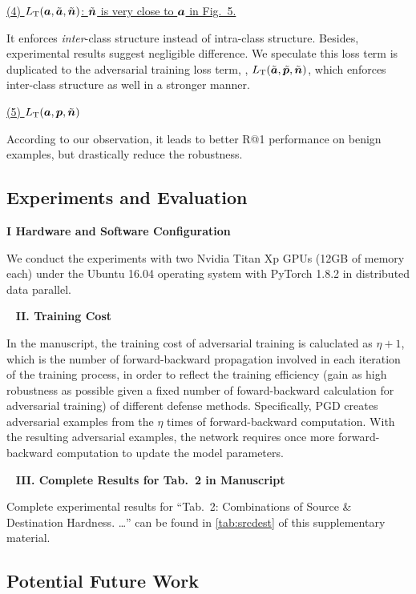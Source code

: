 \ul{(4) $L_\text{T}({\bm{a}}, \tilde{{\bm{a}}}, \tilde{{\bm{n}}})$: $\tilde{{\bm{n}}}$ is very close to ${\bm{a}}$ in Fig.~5.}

It enforces \emph{inter}-class structure instead of intra-class structure.
%
Besides, experimental results suggest negligible difference.
%
We speculate this loss term is duplicated to the adversarial training loss term,
\ie, $L_\text{T}(\tilde{{\bm{a}}}, \tilde{{\bm{p}}}, \tilde{{\bm{n}}})$, which enforces
inter-class structure as well in a stronger manner.

\ul{(5) $L_\text{T}({\bm{a}}, {\bm{p}}, \tilde{{\bm{n}}})$}

According to our observation, it leads to better R@1 performance on benign
examples, but drastically reduce the robustness.

\subsection{Experiments and Evaluation}

\noindent\textbf{I Hardware and Software Configuration}

We conduct the experiments with two Nvidia Titan Xp GPUs (12GB of memory each)
under the Ubuntu 16.04 operating system with PyTorch 1.8.2 in distributed data
parallel.

~\newline
\noindent\textbf{II. Training Cost}

In the manuscript, the training cost of adversarial training is caluclated as
$\eta+1$, which is the number of forward-backward propagation involved in each
iteration of the training process, in order to reflect the training efficiency
(gain as high robustness as possible given a fixed number of foward-backward
calculation for adversarial training) of different defense methods.
%
Specifically, PGD creates adversarial examples from the $\eta$ times of
forward-backward computation.
%
With the resulting adversarial examples, the network requires once
more forward-backward computation to update the model parameters.

~\newline
\noindent\textbf{III. Complete Results for Tab.~2 in Manuscript}



Complete experimental results for ``Tab.~2: Combinations of Source \&
Destination Hardness. \ldots'' can be found in \cref{tab:srcdest} of this
supplementary material.

\subsection{Potential Future Work}

